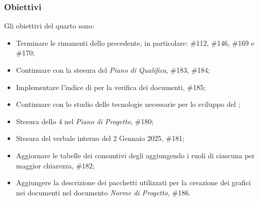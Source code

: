 \subsubsection{Obiettivi}
Gli obiettivi del quarto  sono:
\begin{itemize}
    \item Terminare le  rimanenti dello  precedente, in particolare: \#112, \#146, \#169 e \#170;
    \item Continuare con la stesura del \textit{Piano di Qualifica},  \#183, \#184;
    \item Implementare l'indice di  per la verifica dei documenti,  \#185;
    \item Continuare con lo studio delle tecnologie necessarie per lo sviluppo del ;
    \item Stesura dello  4 nel \textit{Piano di Progetto},  \#180;
    \item Stesura del verbale interno del 2 Gennaio 2025,  \#181;
    \item Aggiornare le tabelle dei consuntivi degli  aggiungendo i ruoli di ciascuna  per maggior chiarezza,  \#182;
    \item Aggiungere la descrizione dei pacchetti utilizzati per la creazione dei grafici nei documenti nel documento \textit{Norme di Progetto},  \#186.
\end{itemize}
